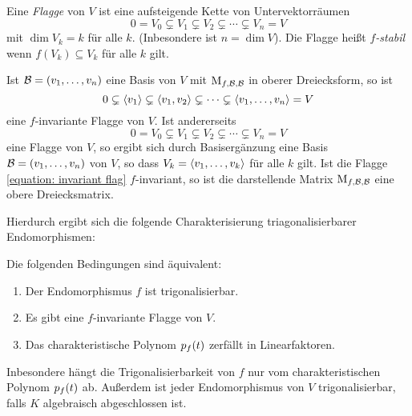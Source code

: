 \begin{definition}
  Eine \emph{Flagge} von $V$ ist eine aufsteigende Kette von Untervektorräumen
  \[
                0
    =           V_0
    \subsetneq  V_1
    \subsetneq  V_2
    \subsetneq  \dotsb
    \subsetneq  V_n
    =           V
  \]
  mit $\dim V_k = k$ für alle $k$.
  \textup(Inbesondere ist $n = \dim V$\textup).
  Die Flagge heißt \emph{$f$-stabil} wenn $f(V_k) \subseteq V_k$ für alle $k$ gilt.
\end{definition}

Ist $\mathcal{B} = (v_1, \dotsc, v_n)$ eine Basis von $V$ mit $\operatorname{M}_{f, \mathcal{B}, \mathcal{B}}$ in oberer Dreiecksform, so ist
\[
              0
  \subsetneq  \left\langle v_1 \right\rangle
  \subsetneq  \left\langle v_1, v_2 \right\rangle
  \subsetneq  \dotsb
  \subsetneq  \left\langle v_1, \dotsc, v_n \right\rangle
  =           V
\]
eine $f$-invariante Flagge von $V$.
Ist andererseits
\begin{equation}
  \label{equation: invariant flag}
              0
  =           V_0
  \subsetneq  V_1
  \subsetneq  V_2
  \subsetneq  \dotsb
  \subsetneq  V_n
  =           V
\end{equation}
eine Flagge von $V$, so ergibt sich durch Basisergänzung eine Basis $\mathcal{B} = (v_1, \dotsc, v_n)$ von $V$, so dass $V_k = \left\langle v_1, \dotsc, v_k \right\rangle$ für alle $k$ gilt.
Ist die Flagge \eqref{equation: invariant flag} $f$-invariant, so ist die darstellende Matrix $\operatorname{M}_{f, \mathcal{B}, \mathcal{B}}$ eine obere Dreiecksmatrix.

Hierdurch ergibt sich die folgende Charakterisierung triagonalisierbarer Endomorphismen:

\begin{theorem}
  \label{theorem: characterization of triagonalizable endomorphisms}
  Die folgenden Bedingungen sind äquivalent:
  \begin{enumerate}
    \item
      Der Endomorphismus $f$ ist trigonalisierbar.
    \item
      Es gibt eine $f$-invariante Flagge von $V$.
    \item
      Das charakteristische Polynom $p_{f}(t)$ zerfällt in Linearfaktoren.
  \end{enumerate}
\end{theorem}

Inbesondere hängt die Trigonalisierbarkeit von $f$ nur vom charakteristischen Polynom $p_{f}(t)$ ab.
Außerdem ist jeder Endomorphismus von $V$ trigonalisierbar, falls $K$ algebraisch abgeschlossen ist.



